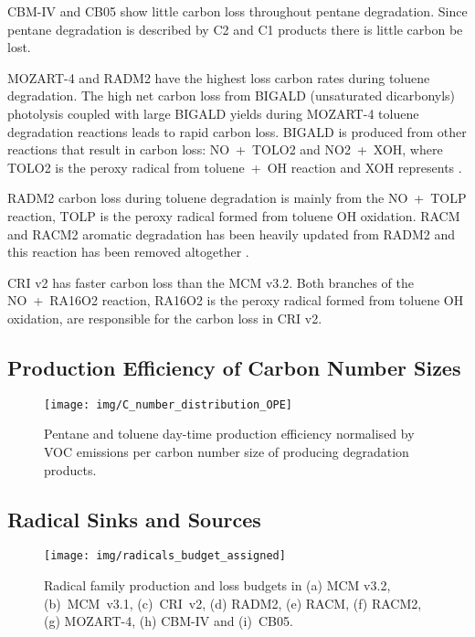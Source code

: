 CBM-IV and CB05 show little carbon loss throughout pentane degradation.
Since pentane degradation is described by C2 and C1 products there is little carbon be lost.

MOZART-4 and RADM2 have the highest loss carbon rates during toluene degradation.
The high net carbon loss from BIGALD (unsaturated dicarbonyls) photolysis coupled with large BIGALD yields during MOZART-4 toluene degradation reactions leads to rapid carbon loss.
BIGALD is produced from other reactions that result in carbon loss: \mbox{NO + TOLO2} and \mbox{NO2 + XOH}, where TOLO2 is the peroxy radical from \mbox{toluene + OH} reaction and XOH represents  \citep{Emmons:2010}.

RADM2 carbon loss during toluene degradation is mainly from the \mbox{NO + TOLP} reaction, TOLP is the peroxy radical formed from toluene OH oxidation.
RACM and RACM2 aromatic degradation has been heavily updated from RADM2 and this reaction has been removed altogether \citep{Stockwell:1997, Goliff:2013}.

CRI v2 has faster carbon loss than the MCM v3.2.
Both branches of the \mbox{NO + RA16O2} reaction, RA16O2 is the peroxy radical formed from toluene OH oxidation, are responsible for the carbon loss in CRI v2.

\subsection[Ox Production Efficiency of Carbon Number Sizes]{ Production Efficiency of Carbon Number Sizes} \label{ss:OPE}

\begin{figure}
    \centering
    \texttt{[image: img/C\_number\_distribution\_OPE]}
    \vspace{0mm}
    \caption{Pentane and toluene day-time  production efficiency normalised by VOC emissions per carbon number size of  producing degradation products.}
    \vspace{-4mm}
    \label{f:net_carbon_loss}
\end{figure}

\subsection{Radical Sinks and Sources} \label{ss:radicals}

\begin{figure}
    \centering
    \texttt{[image: img/radicals\_budget\_assigned]}
    \vspace{0mm}
    \caption{Radical family production and loss budgets in (a) MCM v3.2, \mbox{(b) MCM v3.1}, \mbox{(c) CRI v2}, (d) RADM2, (e) RACM, (f) RACM2, (g) MOZART-4, (h) CBM-IV and \mbox{(i) CB05}.}
    \vspace{-4mm}
    \label{f:radical_budgets} 
\end{figure} 

